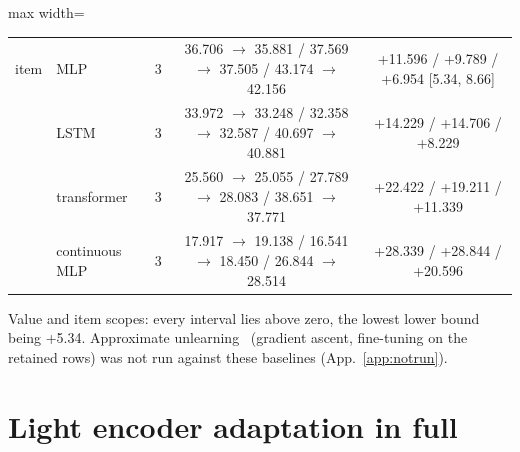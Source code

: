 \documentclass{article} %
\begin{document}
\begin{table}[h]
\begin{adjustbox}{max width=\linewidth}
\begin{tabular}{llccc}
item & MLP & 3 & 36.706 $\to$ 35.881 / 37.569 $\to$ 37.505 / 43.174 $\to$ 42.156 & +11.596 / +9.789 / +6.954 [5.34, 8.66] \\
 & LSTM & 3 & 33.972 $\to$ 33.248 / 32.358 $\to$ 32.587 / 40.697 $\to$ 40.881 & +14.229 / +14.706 / +8.229 \\
 & transformer & 3 & 25.560 $\to$ 25.055 / 27.789 $\to$ 28.083 / 38.651 $\to$ 37.771 & +22.422 / +19.211 / +11.339 \\
 & continuous MLP & 3 & 17.917 $\to$ 19.138 / 16.541 $\to$ 18.450 / 26.844 $\to$ 28.514 & +28.339 / +28.844 / +20.596 \\
\bottomrule
\end{tabular}\end{adjustbox}
\end{table}

\noindent Value and item scopes: every interval lies above zero, the lowest lower bound being %
+5.34. Approximate unlearning~\citep{guo_certified_2023,golatkar_eternal_2020} (gradient ascent, fine-tuning on the retained rows) was not run %
against these baselines (App.~\ref{app:notrun}).
\section{Light encoder adaptation in full}
\label{app:adapt}
\end{document}
